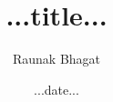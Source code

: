\documentclass{article}
\newcommand{\myname}{Raunak Bhagat}
\begin{document}
\title{...title...}
\author{\myname}
\date{...date...}
\maketitle

\newpage

\end{document}
